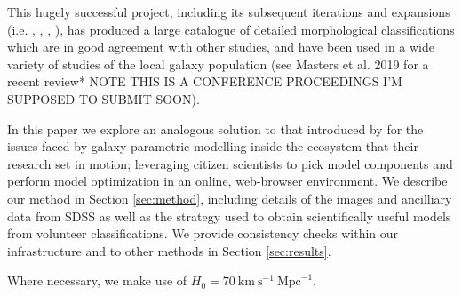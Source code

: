 \documentclass[../main.tex]{subfiles}
\begin{document}
This hugely successful project, including its subsequent iterations and expansions (i.e. \citealt{Willett2013:1308.3496v2}, \citealt{2017MNRAS.464.4176W}, \citealt{2017MNRAS.464.4420S}, \citealt{Hart2016:1607.01019v1}), has produced a large catalogue of detailed morphological classifications which are in good agreement with other studies, and have been used in a wide variety of studies of the local galaxy population (see Masters et al. 2019 for a recent review* NOTE THIS IS A CONFERENCE PROCEEDINGS I'M SUPPOSED TO SUBMIT SOON). 

In this paper we explore an analogous solution to that introduced by \citet{Lintott2008:0804.4483v1} for the issues faced by galaxy parametric modelling inside the ecosystem that their research set in motion; leveraging citizen scientists to pick model components and perform model optimization in an online, web-browser environment. We describe our method in Section \ref{sec:method}, including details of the images and ancilliary data from SDSS as well as the strategy used to obtain scientifically useful models from volunteer classifications. We provide consistency checks within our infrastructure and to other methods in Section \ref{sec:results}.

Where necessary, we make use of $H_0 = 70\ \text{km}\ \text{s}^{-1}\ \text{Mpc}^{-1}$.
\end{document}
